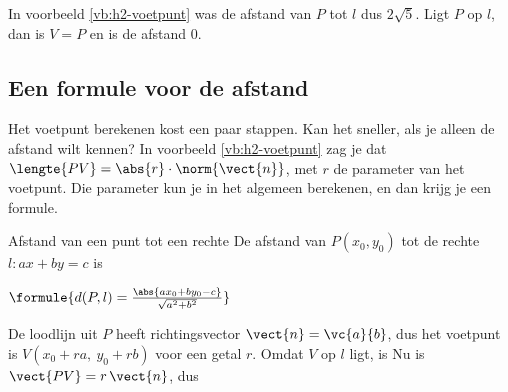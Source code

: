 
In voorbeeld \ref{vb:h2-voetpunt} was de afstand van $P$ tot $l$ dus $2\sqrt5$. Ligt $P$ op $l$, dan is $V = P$ en is de afstand $0$.

\subsection{Een formule voor de afstand}

Het voetpunt berekenen kost een paar stappen. Kan het sneller, als je alleen de afstand wilt kennen? In voorbeeld \ref{vb:h2-voetpunt} zag je dat $\lengte{PV} = \abs{r} \cdot \norm{\vect{n}}$, met $r$ de parameter van het voetpunt. Die parameter kun je in het algemeen berekenen, en dan krijg je een formule.

\begin{theorie}
\begin{stelling}{Afstand van een punt tot een rechte}
De afstand van $P(x_0, y_0)$ tot de rechte $l\colon ax + by = c$ is

\vspace{1mm}
\qquad $\formule{d(P, l) = \frac{\abs{a x_0 + b y_0 - c}}{\sqrt{a^2 + b^2}}}$
\end{stelling}
\begin{bewijs}
De loodlijn uit $P$ heeft richtingsvector $\vect{n} = \vc{a}{b}$, dus het voetpunt is $V(x_0 + ra,\ y_0 + rb)$ voor een getal $r$. Omdat $V$ op $l$ ligt, is
Nu is $\vect{PV} = r\,\vect{n}$, dus
\end{bewijs}
\end{theorie}

